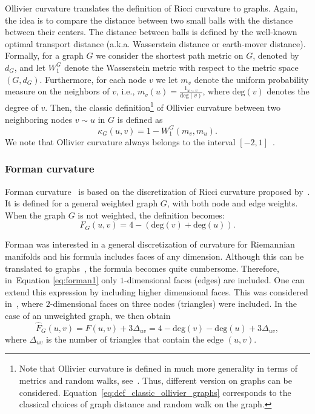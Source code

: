 \documentclass[runningheads]{llncs}
\newcommand{\ch}[1]{{\color{red} #1}}
\begin{document}
Ollivier curvature translates the definition of Ricci curvature to graphs. Again, the idea is to compare the distance between two small balls with the distance between their centers. The distance between balls is defined by the well-known optimal transport distance (a.k.a. Wasserstein distance or earth-mover distance).
Formally, for a graph $G$ we consider the shortest path metric on $G$, denoted by $d_G$, and let $W_1^G$ denote the Wasserstein metric with respect to the metric space $(G,d_G)$. Furthermore, for each node $v$ we let $m_v$ denote the uniform probability measure on the neighbors of $v$, i.e., $m_v(u) = \frac{1_{u \sim v}}{\mathrm{deg}(v)}$, where $\mathrm{deg}(v)$ denotes the degree of $v$. Then, the classic definition\footnote{Note that Ollivier curvature is defined in much more generality in terms of metrics and random walks, see~\cite{ollivier2009ricci}. Thus, different version on graphs can be considered. Equation~\eqref{eq:def_classic_ollivier_graphs} corresponds to the classical choices of graph distance and random walk on the graph.} of Ollivier curvature between two neighboring nodes $v \sim u$ in $G$ is defined as
\begin{equation}\label{eq:def_classic_ollivier_graphs}
	\kappa_G(u,v) = 1 - W_1^G(m_v, m_u).
\end{equation}
We note that Ollivier curvature always belongs to the interval $[-2,1]$~\cite{jost2014ollivier}.

\subsubsection{Forman curvature}

Forman curvature~\cite{sreejith2016forman} is based on the discretization of Ricci curvature proposed by~\cite{forman2003bochner}. It is defined for a general weighted graph $G$, with both node and edge weights. 
When the graph $G$ is not weighted, 
the definition becomes:
\begin{equation}\label{eq:forman1}
F_G(u,v) 
= 4 - (\mathrm{deg}(v) + \mathrm{deg}(u)).
\end{equation}

Forman was interested in a general discretization of curvature for Riemannian manifolds and his formula includes faces of any dimension. Although this can be translated to graphs~\cite{weber2017coarse}, the formula becomes quite cumbersome. Therefore, \ch{in~Equation \ref{eq:forman1}} only $1$-dimensional faces (edges) are included. One can extend this expression by including higher dimensional faces. This was considered in~\cite{samal2018comparative}, where $2$-dimensional faces on three nodes (triangles) were included. In the case of an unweighted graph, we then obtain
\begin{equation}\label{eq:forman2}
	\hat F_G(u,v) = F(u,v) + 3\Delta_{uv} 
	= 4 - \mathrm{deg}(v) - \mathrm{deg}(u) + 3\Delta_{uv},
\end{equation}
where $\Delta_{uv}$ is the number of triangles that contain the edge $(u,v)$. 
\end{document}
